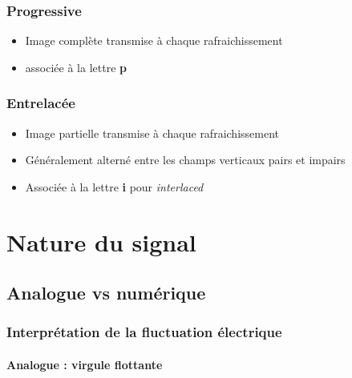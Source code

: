 \documentclass[
  french,
]{book}
\providecommand{\tightlist}{%
  \setlength{\itemsep}{0pt}\setlength{\parskip}{0pt}}
\begin{document}
\hypertarget{progressive}{%
\subsubsection{Progressive}\label{progressive}}

\begin{itemize}
\tightlist
\item
  Image complète transmise à chaque rafraichissement
\item
  associée à la lettre \textbf{p}
\end{itemize}

\hypertarget{entrelacuxe9e}{%
\subsubsection{Entrelacée}\label{entrelacuxe9e}}

\begin{itemize}
\tightlist
\item
  Image partielle transmise à chaque rafraichissement
\item
  Généralement alterné entre les champs verticaux pairs et impairs
\item
  Associée à la lettre \textbf{i} pour \emph{interlaced}
\end{itemize}

\hypertarget{nature-du-signal}{%
\section{Nature du signal}\label{nature-du-signal}}

\hypertarget{analogue-vs-numuxe9rique}{%
\subsection{Analogue vs numérique}\label{analogue-vs-numuxe9rique}}

\hypertarget{interpruxe9tation-de-la-fluctuation-uxe9lectrique}{%
\subsubsection{Interprétation de la fluctuation électrique}\label{interpruxe9tation-de-la-fluctuation-uxe9lectrique}}

\hypertarget{analogue-virgule-flottante}{%
\paragraph{Analogue : virgule flottante}\label{analogue-virgule-flottante}}
\end{document}
